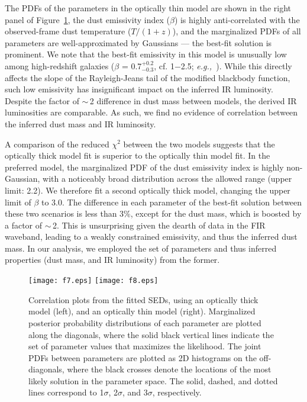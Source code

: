 \documentclass[iop]{emulateapj}
\newcommand{\eg}{{\sl e.g.,~}}
\begin{document}
The PDFs of the parameters in the optically thin model are shown in the right panel of Figure~\ref{fig:sedlikelihood}, the dust emissivity index ($\beta$) is highly anti-correlated with the observed-frame dust temperature ($T/(1+z)$), and the marginalized PDFs of all parameters are well-approximated by Gaussians --- the best-fit solution is prominent.
We note that the best-fit emissivity in this model is unusually low among high-redshift galaxies ($\beta$ = 0.7$^{+0.2}_{-0.3}$, cf. 1$-$2.5; \eg \citealt[][and references therein]{Casey12a}). While this directly affects the slope of the Rayleigh-Jeans tail of the modified blackbody function, such low emissivity has insignificant impact on the inferred IR luminosity.
Despite the factor of $\sim$\,2 difference
in dust mass
between models, the derived IR luminosities are comparable. As such, we find no evidence of correlation between the inferred dust mass and IR luminosity. 

A comparison of the reduced $\chi^2$ between the two models suggests that the optically thick model fit is superior to the optically thin model fit. In the preferred model, the marginalized PDF of the dust emissivity index is highly non-Gaussian, with a noticeably broad distribution across
the allowed range (upper limit: 2.2). We therefore fit a second optically thick model, changing the upper limit of $\beta$ to 3.0. The difference in each
parameter of the best-fit solution between these two scenarios is less than 3\%, except for the dust mass, which is boosted by a factor of $\sim$\,2. This is
unsurprising given the dearth of data in the FIR waveband, leading to a weakly constrained emissivity, and thus the inferred dust mass.
In our analysis, we employed the set of parameters and thus inferred properties (dust mass, and IR luminosity) from the former.


\begin{figure}[!tbph]
\centering
\hspace{-1cm}
\texttt{[image: f7.eps]}
\hspace{-1.15cm}
\texttt{[image: f8.eps]}
\hspace{-1cm}
\caption{Correlation plots from the fitted SEDs, using an optically thick
model (left), and an optically thin model (right). Marginalized posterior probability
distributions of each
parameter are plotted along the diagonals, where the solid black vertical lines indicate the set of parameter values that maximizes the likelihood. The joint PDFs between parameters are plotted as 2D histograms on the off-diagonals, where the black crosses denote the
locations of the most likely solution in the parameter space. The solid, dashed, and dotted lines correspond to 1$\sigma$, 2$\sigma$, and $3\sigma$, respectively. 
\label{fig:sedlikelihood}}
\end{figure}
\end{document}
